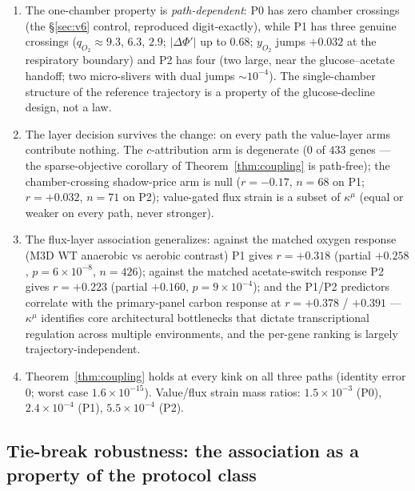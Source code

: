 \documentclass[11pt,a4paper]{article}
\theoremstyle{plain}
\theoremstyle{definition}
\theoremstyle{remark}
\newcommand{\kmu}{\kappa^{\mu}}
\begin{document}
\begin{enumerate}[label=(\roman*),leftmargin=2em]
\item The one-chamber property is \emph{path-dependent}: P0 has zero
      chamber crossings (the \S\ref{sec:v6} control, reproduced digit-exactly), while P1 has
      three genuine crossings ($q_{O_2} \approx 9.3$, $6.3$, $2.9$;
      $|\Delta\Phi'|$ up to $0.68$; $y_{O_2}$ jumps $+0.032$ at the
      respiratory boundary) and P2 has four (two large, near the
      glucose--acetate handoff; two micro-slivers with dual jumps
      $\sim 10^{-4}$). The single-chamber structure of the reference trajectory is a property of the glucose-decline design, not a law.
\item The layer decision survives the change: on every path the
      value-layer arms contribute nothing. The $c$-attribution arm is
      degenerate ($0$ of $433$ genes --- the sparse-objective
      corollary of Theorem~\ref{thm:coupling} is path-free); the
      chamber-crossing shadow-price arm is null ($r = -0.17$,
      $n = 68$ on P1; $r = +0.032$, $n = 71$ on P2); value-gated flux
      strain is a subset of $\kmu$ (equal or weaker on every path,
      never stronger).
\item The flux-layer association generalizes: against the matched
      oxygen response (M3D WT anaerobic vs aerobic contrast) P1 gives
      $r = +0.318$ (partial $+0.258$, $p = 6 \times 10^{-8}$,
      $n = 426$); against the matched acetate-switch response P2
      gives $r = +0.223$ (partial $+0.160$, $p = 9 \times
      10^{-4}$); and the P1/P2 predictors correlate with the
      primary-panel carbon response at $r = +0.378$ / $+0.391$ ---
      $\kmu$ identifies core architectural bottlenecks that dictate
      transcriptional regulation across multiple environments, and
      the per-gene
      ranking is largely trajectory-independent.
\item Theorem~\ref{thm:coupling} holds at every kink on all three
      paths (identity error $0$; worst case $1.6 \times 10^{-15}$).
      Value/flux strain mass ratios: $1.5 \times 10^{-3}$ (P0),
      $2.4 \times 10^{-4}$ (P1), $5.5 \times 10^{-4}$ (P2).
\end{enumerate}

\subsection{Tie-break robustness: the association as a property
of the protocol class}\label{sec:v8}
\end{document}

